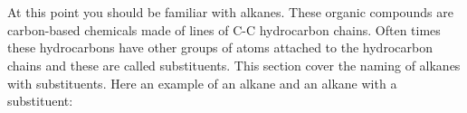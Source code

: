 \documentclass[main.tex]{subfiles}
\begin{document}
\section{\color{blue!30!black}{Alkanes with substituyents}}
At this point you should be familiar with alkanes. These organic compounds are carbon-based chemicals made of lines of C-C hydrocarbon chains. Often times these hydrocarbons have other groups of atoms attached to the hydrocarbon chains and these are called substituents. This section cover the naming of alkanes with substituents. Here an example of an alkane and an alkane with a substituent:
\begin{center}\hspace{1cm}
\end{center}
\sloppy
\end{document}
